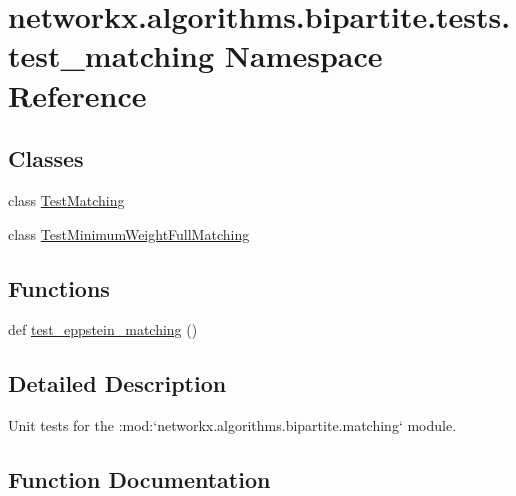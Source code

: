 \hypertarget{namespacenetworkx_1_1algorithms_1_1bipartite_1_1tests_1_1test__matching}{}\section{networkx.\+algorithms.\+bipartite.\+tests.\+test\+\_\+matching Namespace Reference}
\label{namespacenetworkx_1_1algorithms_1_1bipartite_1_1tests_1_1test__matching}
\subsection*{Classes}
\begin{DoxyCompactItemize}
\item 
class \hyperlink{classnetworkx_1_1algorithms_1_1bipartite_1_1tests_1_1test__matching_1_1TestMatching}{Test\+Matching}
\item 
class \hyperlink{classnetworkx_1_1algorithms_1_1bipartite_1_1tests_1_1test__matching_1_1TestMinimumWeightFullMatching}{Test\+Minimum\+Weight\+Full\+Matching}
\end{DoxyCompactItemize}
\subsection*{Functions}
\begin{DoxyCompactItemize}
\item 
def \hyperlink{namespacenetworkx_1_1algorithms_1_1bipartite_1_1tests_1_1test__matching_af9872d914d13189fc8e2cbbee877b1de}{test\+\_\+eppstein\+\_\+matching} ()
\end{DoxyCompactItemize}


\subsection{Detailed Description}
\begin{DoxyVerb}Unit tests for the :mod:`networkx.algorithms.bipartite.matching` module.\end{DoxyVerb}
 

\subsection{Function Documentation}
\mbox{\label{namespacenetworkx_1_1algorithms_1_1bipartite_1_1tests_1_1test__matching_af9872d914d13189fc8e2cbbee877b1de}} 
